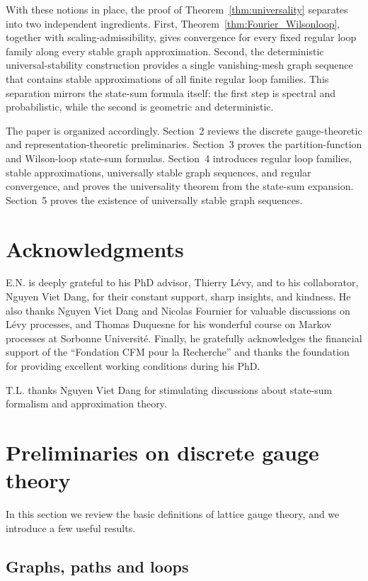 \documentclass[11pt,a4paper,reqno]{article}
\theoremstyle{definition}
\theoremstyle{remark}
\begin{document}
With these notions in place, the proof of Theorem~\ref{thm:universality} separates into two independent ingredients. First, Theorem~\ref{thm:Fourier_Wilsonloop}, together with scaling-admissibility, gives convergence for every fixed regular loop family along every stable graph approximation. Second, the deterministic universal-stability construction provides a single vanishing-mesh graph sequence that contains stable approximations of all finite regular loop families. This separation mirrors the state-sum formula itself: the first step is spectral and probabilistic, while the second is geometric and deterministic.

The paper is organized accordingly. Section~2 reviews the discrete gauge-theoretic and representation-theoretic preliminaries. Section~3 proves the partition-function and Wilson-loop state-sum formulas. Section~4 introduces regular loop families, stable approximations, universally stable graph sequences, and regular convergence, and proves the universality theorem from the state-sum expansion. Section~5 proves the existence of universally stable graph sequences.
\section*{Acknowledgments}
\par E.N. is deeply grateful to his PhD advisor, Thierry Lévy, and to his collaborator, Nguyen Viet Dang, for their constant support, sharp insights, and kindness. He also thanks Nguyen Viet Dang and Nicolas Fournier for valuable discussions on Lévy processes, and Thomas Duquesne for his wonderful course on Markov processes at Sorbonne Université. 
Finally, he gratefully acknowledges the financial support of the ``Fondation CFM pour la Recherche'' and thanks the foundation for providing excellent working conditions during his PhD. 
\par T.L. thanks Nguyen Viet Dang for stimulating discussions about state-sum formalism and approximation theory.

\section{Preliminaries on discrete gauge theory}

In this section we review the basic definitions of lattice gauge theory, and we introduce a few useful results.

\subsection{Graphs, paths and loops}
\end{document}
